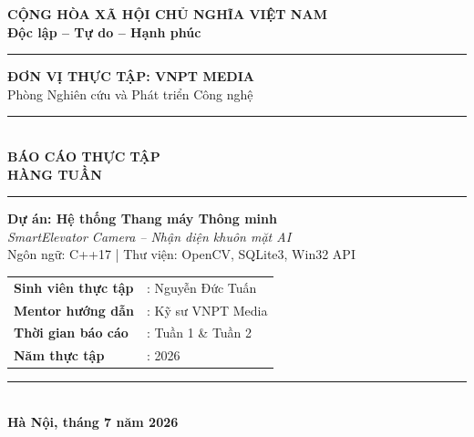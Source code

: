 \documentclass[12pt,a4paper]{article}
\begin{document}
\begin{titlepage}
    \centering
    \vspace*{0.5cm}

    {\large \textbf{CỘNG HÒA XÃ HỘI CHỦ NGHĨA VIỆT NAM}} \\
    {\large \textbf{Độc lập -- Tự do -- Hạnh phúc}} \\
    \vspace{0.3cm}
    \rule{8cm}{1.2pt}

    \vspace{1.5cm}

    {\large \textbf{ĐƠN VỊ THỰC TẬP: VNPT MEDIA}} \\[0.3cm]
    {\large Phòng Nghiên cứu và Phát triển Công nghệ} \\

    \vspace{2cm}

    \rule{14cm}{1pt} \\[0.5cm]
    {\Huge \bfseries \color{vnptblue} BÁO CÁO THỰC TẬP} \\[0.4cm]
    {\LARGE \bfseries HÀNG TUẦN} \\[0.3cm]
    \rule{14cm}{1pt}

    \vspace{1.5cm}

    {\Large \bfseries Dự án: Hệ thống Thang máy Thông minh} \\[0.3cm]
    {\large \textit{SmartElevator Camera -- Nhận diện khuôn mặt AI}} \\[0.3cm]
    {\normalsize Ngôn ngữ: C++17 \quad | \quad Thư viện: OpenCV, SQLite3, Win32 API}

    \vspace{2.5cm}

    \begin{table}[H]
        \centering
        \large
        \begin{tabular}{ll}
            \textbf{Sinh viên thực tập} & : Nguyễn Đức Tuấn \\[0.3cm]
            \textbf{Mentor hướng dẫn}   & : Kỹ sư VNPT Media \\[0.3cm]
            \textbf{Thời gian báo cáo}  & : Tuần 1 \& Tuần 2 \\[0.3cm]
            \textbf{Năm thực tập}       & : 2026 \\
        \end{tabular}
    \end{table}

    \vfill
    \rule{8cm}{0.5pt} \\[0.3cm]
    {\textbf{Hà Nội, tháng 7 năm 2026}}
\end{titlepage}
\end{document}
